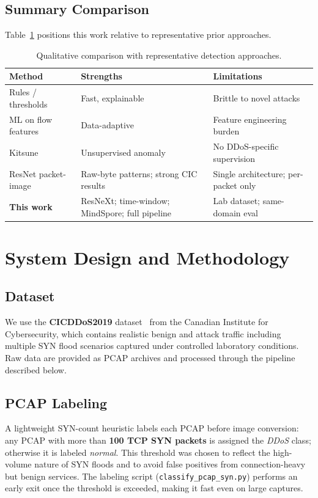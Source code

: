 \documentclass[conference]{IEEEtran}
\begin{document}
\subsection{Summary Comparison}
Table~\ref{tab:related} positions this work relative to representative prior
approaches.

\begin{table}[htbp]
\centering
\caption{Qualitative comparison with representative detection approaches.}
\label{tab:related}
\renewcommand{\arraystretch}{1.15}
\begin{tabular}{@{}>{\RaggedRight\arraybackslash}p{1.75cm}
                   >{\RaggedRight\arraybackslash}p{2.45cm}
                   >{\RaggedRight\arraybackslash}p{2.35cm}@{}}
\toprule
\textbf{Method} & \textbf{Strengths} & \textbf{Limitations} \\
\midrule
Rules / thresholds & Fast, explainable & Brittle to novel attacks \\
ML on flow features & Data-adaptive & Feature engineering burden \\
Kitsune~\cite{mirsky2019kitsune} & Unsupervised anomaly & No DDoS-specific supervision \\
ResNet packet-image~\cite{bazzi2020resnet} & Raw-byte patterns; strong CIC results & Single architecture; per-packet only \\
\textbf{This work} & ResNeXt; time-window; MindSpore; full pipeline & Lab dataset; same-domain eval \\
\bottomrule
\end{tabular}
\end{table}

\section{System Design and Methodology}
\label{sec:method}

\subsection{Dataset}
We use the \textbf{CICDDoS2019} dataset~\cite{cicddos2019} from the Canadian
Institute for Cybersecurity, which contains realistic benign and attack traffic
including multiple SYN flood scenarios captured under controlled laboratory
conditions.
Raw data are provided as PCAP archives and processed through the pipeline
described below.

\subsection{PCAP Labeling}
A lightweight SYN-count heuristic labels each PCAP before image conversion:
any PCAP with more than \textbf{100 TCP SYN packets} is assigned the \textit{DDoS}
class; otherwise it is labeled \textit{normal}.
This threshold was chosen to reflect the high-volume nature of SYN floods
and to avoid false positives from connection-heavy but benign services.
The labeling script (\texttt{classify\_pcap\_syn.py}) performs an early exit
once the threshold is exceeded, making it fast even on large captures.
\end{document}
